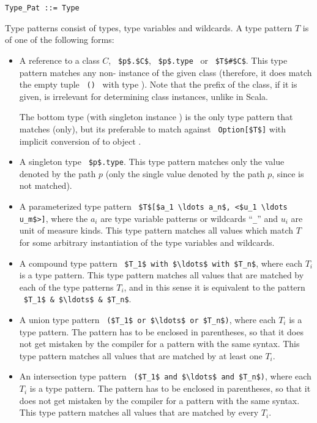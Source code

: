 \grammar\begin{lstlisting}
Type_Pat ::= Type
\end{lstlisting}

Type patterns consist of types, type variables and wildcards. A type pattern $T$ is of one of the following forms: 
\begin{itemize}
  \item[] A reference to a class $C$, ~\lstinline!$p$.$C$!, ~\lstinline!$p$.type!~ or ~\lstinline!$T$#$C$!. This type pattern matches any non- instance of the given class (therefore, it does match the empty tuple ~\lstinline!()!~ with type ). Note that the prefix of the class, if it is given, is irrelevant for determining class instances, unlike in Scala. 

  The bottom type  (with singleton instance ) is the only type pattern that matches  (only), but its preferable to match against ~\lstinline!Option[$T$]! with implicit conversion of  to object . 

  \item[] A singleton type ~\lstinline!$p$.type!. This type pattern matches only the value denoted by the path $p$ (only the single value denoted by the path $p$, since  is not matched). 

  \item[] A parameterized type pattern ~\lstinline!$T$[$a_1 \ldots a_n$, <$u_1 \ldots u_m$>]!, where the $a_i$ are type variable patterns or wildcards ``\lstinline!_!'' and $u_i$ are unit of measure kinds. This type pattern matches all values which match $T$ for some arbitrary instantiation of the type variables and wildcards.  

  \item[] A compound type pattern ~\lstinline!$T_1$ with $\ldots$ with $T_n$!, where each $T_i$ is a type pattern. This type pattern matches all values that are matched by each of the type patterns $T_i$, and in this sense it is equivalent to the pattern ~\lstinline!$T_1$ & $\ldots$ & $T_n$!. 

  \item[] A union type pattern ~\lstinline!($T_1$ or $\ldots$ or $T_n$)!, where each $T_i$ is a type pattern. The pattern has to be enclosed in parentheses, so that it does not get mistaken by the compiler for a pattern with the same syntax. This type pattern matches all values that are matched by at least one $T_i$. 

  \item[] An intersection type pattern ~\lstinline!($T_1$ and $\ldots$ and $T_n$)!, where each $T_i$ is a type pattern. The pattern has to be enclosed in parentheses, so that it does not get mistaken by the compiler for a pattern with the same syntax. This type pattern matches all values that are matched by every $T_i$. 
\end{itemize}

